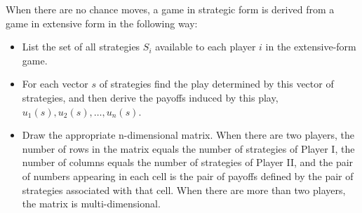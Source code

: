 When there are no chance moves, a game in strategic form is derived from a game in extensive form in the following way:

\begin{itemize}
	\item List the set of all strategies $S_i$ available to each player $i$ in the extensive-form game.
	\item For each vector $s$ of strategies find the play determined by this vector of strategies, and then derive the payoffs induced by this play, $u_1(s), u_2(s), \ldots, u_n(s)$.
	\item Draw the appropriate n-dimensional matrix. When there are two players, the number of rows in the matrix equals the number of strategies of Player I, the number of columns equals the number of strategies of Player II, and the pair of numbers appearing in each cell is the pair of payoffs defined by the pair of strategies associated with that cell. When there are more than two players, the matrix is multi-dimensional.
\end{itemize}

